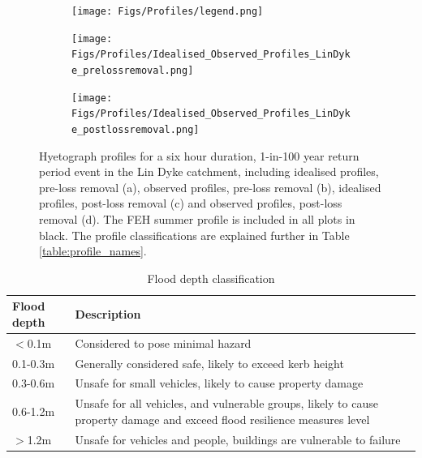 \documentclass[APA,Times2COL]{WileyNJDv5}
\begin{document}
\begin{figure}[!t] 
\begin{subfigure}[H]{\linewidth}
\flushright
\texttt{[image: Figs/Profiles/legend.png]}
\end{subfigure}
\begin{subfigure}[H]{\linewidth}
\texttt{[image: Figs/Profiles/Idealised\_Observed\_Profiles\_LinDyke\_prelossremoval.png]}
\end{subfigure}
\begin{subfigure}{\linewidth}
  \centering
  \texttt{[image: Figs/Profiles/Idealised\_Observed\_Profiles\_LinDyke\_postlossremoval.png]}
\end{subfigure}
\caption{Hyetograph profiles for a six hour duration, 1-in-100 year return period event in the Lin Dyke catchment, including idealised profiles, pre-loss removal (a), observed profiles, pre-loss removal (b), idealised profiles, post-loss removal (c) and observed profiles, post-loss removal (d). The FEH summer profile is included in all plots in black. The profile classifications are explained further in Table \ref{table:profile_names}.} \label{fig:profiles} 
\end{figure}

\begingroup
\setlength\tabcolsep{0pt}
\renewcommand{\arraystretch}{1.5} %
\begin{table}[h!]
\centering
\caption{Flood depth classification \citep{envagency2019}}
\begin{tabular}{C{3cm} C{14cm}} 
 \hline
 \textbf{Flood depth} & \textbf{Description} \\ [0.5ex] 
 \hline
 $<$0.1m & Considered to pose minimal hazard \\
 0.1-0.3m & Generally considered safe, likely to exceed kerb height \\
 0.3-0.6m & Unsafe for small vehicles, likely to cause property damage \\
 0.6-1.2m & Unsafe for all vehicles, and vulnerable groups, likely to cause property damage and exceed flood resilience measures level\\
 $>$1.2m & Unsafe for vehicles and people, buildings are vulnerable to failure \\
 [1ex] 
 \hline
\end{tabular}
\label{table:depth_cats}
\end{table}
\end{document}
